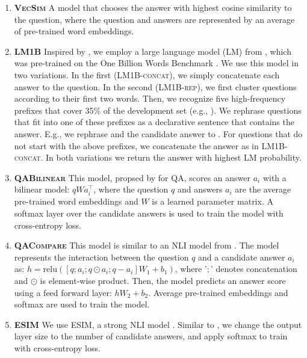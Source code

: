\begin{enumerate}[wide, labelwidth=!,labelindent=0pt,topsep=0pt,itemsep=0pt,label=\textbf{\alph*}]
    \item \textbf{\textsc{VecSim}} A  model that chooses the answer with highest cosine similarity to the question, where the question and answers are represented by an average of pre-trained word embeddings.
    \item \textbf{\textsc{LM1B}} Inspired by , we employ a large language model (LM) from , which was pre-trained on the One Billion Words Benchmark \cite{chelba2013one}. We use this model in two variations. In the first (\textsc{LM1B-concat}), we simply concatenate each answer to the question. In the second (\textsc{LM1B-rep}), we first cluster questions according to their first two words. Then, we recognize five high-frequency prefixes that cover 35\% of the development set (e.g., ). We rephrase questions that fit into one of these prefixes as a declarative sentence that contains the answer. E.g., we rephrase  and the candidate answer  to . For questions that do not start with the above prefixes, we concatenate the answer as in \textsc{LM1B-concat}. In both variations we return the answer with highest LM probability.
    \item \textbf{\textsc{QABilinear}} This model, propsed by  for QA, scores an answer $a_i$ with a bilinear model: $q W a_i^\top$, where the question $q$ and answers $a_i$ are the average pre-trained word embeddings and $W$ is a learned parameter matrix. A softmax layer over the candidate answers is used to train the model with cross-entropy loss.
    \item \textbf{\textsc{QACompare}} This model is similar to an NLI model from . The model represents the interaction between the question $q$ and a candidate answer $a_i$ as:  $h=\text{relu}([q ; a_i ; q \odot a_i; q - a_i]W_1 + b_1)$, where '$;$' denotes concatenation and $\odot$ is element-wise product. Then, the model predicts an answer score using a feed forward layer: $hW_2 + b_2$. Average pre-trained embeddings and softmax are used to train the model.

    \item \textbf{\textsc{ESIM}} We use ESIM, a strong NLI model \cite{chen2016enhanced}. Similar to , we change the output layer size to the number of candidate answers, and apply softmax to train with cross-entropy loss.


\end{enumerate}
